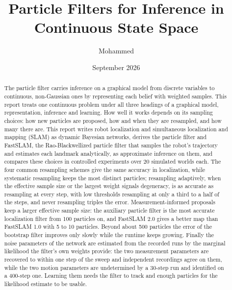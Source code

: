 \documentclass[11pt,a4paper]{article}
\title{Particle Filters for Inference in Continuous State Space}
\author{Mohammed}
\date{September 2026}
\begin{document}
\maketitle

\begin{abstract}
The particle filter carries inference on a graphical model from discrete variables to continuous, non-Gaussian
ones by representing each belief with weighted samples. This report treats one continuous problem under all three
headings of a graphical model, representation, inference and learning. How well it works depends on its sampling choices: how
new particles are proposed, how and when they are resampled, and how many there are. This report writes robot
localization and simultaneous localization and mapping (SLAM) as dynamic Bayesian networks, derives the particle
filter and FastSLAM, the Rao-Blackwellized particle filter that samples the robot's trajectory and estimates each
landmark analytically, as approximate inference on them, and compares these choices in controlled experiments
over 20 simulated worlds each. The four common resampling schemes give the same accuracy in localization, while
systematic resampling keeps the most distinct particles; resampling adaptively, when the effective sample size
or the largest weight signals degeneracy, is as accurate as resampling at every step, with low thresholds resampling at
only a third to a half of the steps, and never resampling triples the error. Measurement-informed proposals keep a larger effective sample
size: the auxiliary particle filter is the most accurate localization filter from 100 particles on, and
FastSLAM 2.0 gives a better map than FastSLAM 1.0 with 5 to 10 particles. Beyond about 500 particles the error
of the bootstrap filter improves only slowly while the runtime keeps growing. Finally the noise parameters of the
network are estimated from the recorded runs by the marginal likelihood the filter's own weights provide: the two
measurement parameters are recovered to within one step of the sweep and independent recordings agree on them,
while the two motion parameters are undetermined by a 30-step run and identified on a 400-step one. Learning them
needs the filter to track and enough particles for the likelihood estimate to be usable.
\end{abstract}









\appendix


{\sloppy\printbibliography}
\end{document}
